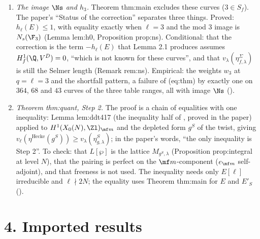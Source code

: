 \begin{enumerate}[label=(\alph*), leftmargin=*]
and $3$''. The identity needs only the definition; Proposition prop:shapes (four shapes of $P_q$ at every bad prime, proved
from the image of inertia) makes them explicit, and Remark rem:wild gives the examples , ,
. The file \texttt{final/pipeline/samples/wild\_euler\_q23.csv} (with its \texttt{README.md} and log) records
$P_q$, $P_q(q^{-2})$ and $e_\ell$ for $3{,}305$ rows at $q=2,3$ ($2{,}905$ curves: those named in the paper and the optimal
non-CM curves with $N<2{,}000$ and $4\mid N$ or $9\mid N$), each matched to one of the four shapes, with no mismatch.
\item \emph{The image $\Ns$ and $h_3$.} Theorem thm:main excludes these curves ($3\in S_f$). The paper's ``Status of the
correction'' separates three things. Proved: $h_\ell(E)\le1$, with equality exactly when $\ell=3$ and the mod $3$ image is
$N_s(\F_3)$ (Lemma lem:h0, Proposition prop:ns). Conditional: that the correction is the term $-h_\ell(E)$ that Lemma 2.1
produces assumes $H^1_f(\Q,V^D)=0$, ``which is not known for these curves'', and that $v_\lambda(\eta^\Sigma_{f,\lambda})$ is
still the Selmer length (Remark rem:ns). Empirical: the weights $w_3$ at $q=\ell=3$ and the shortfall pattern, a failure of
(eq:thm) by exactly one on $364$, $68$ and $43$ curves of the three table ranges, all with image $\Ns$
().
\item \emph{Theorem thm:quant, Step 2.} The proof is a chain of equalities with one inequality: Lemma lem:ddt417 (the
inequality half of \cite[Lemma 4.17]{DDT}, proved in the paper) applied to $H^1(X_0(N),\Zl)_{\mf m}$ and the depleted form
$g^S$ of the twist, giving $v_\ell(\eta^{\mathrm{Hecke}}(g^S))\ge v_\lambda(\eta^S_{g,\lambda})$; in the paper's words, ``the
only inequality is Step 2''. To check: that $L[\wp]$ is the lattice $M_{g^S,\lambda}$ (Proposition prop:integral at level
$N$), that the pairing is perfect on the $\mf m$-component ($e_{\mf m}$ self-adjoint), and that freeness is not used. The
inequality needs only $E[\ell]$ irreducible and $\ell\nmid2N$; the equality uses Theorem thm:main for $E$ and $E'_S$
().
\end{enumerate}

\section*{4. Imported results}


